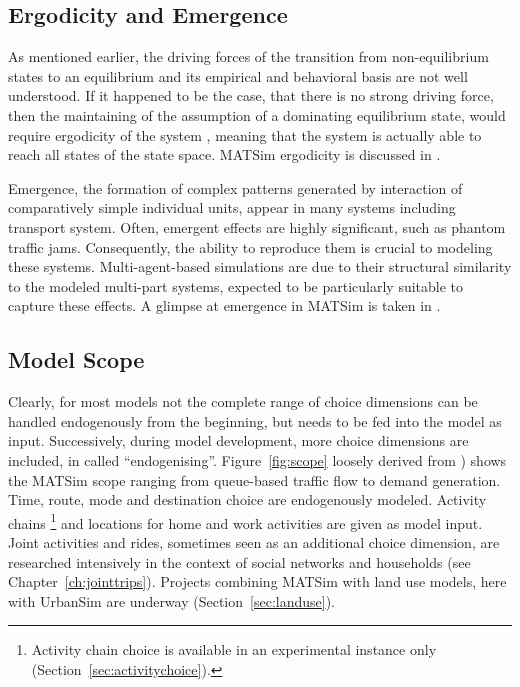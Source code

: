 
\subsection{Ergodicity and Emergence}
As mentioned earlier, the driving forces of the transition from non-equilibrium states to an equilibrium and its empirical and behavioral basis are not well understood. If it happened to be the case, that there is no strong driving force, then the maintaining of the assumption of a dominating equilibrium state, would require ergodicity of the system \citep[see also][p.252]{Holden_JTEP_1989}, meaning that the system is actually able to reach all states of the state space. MATSim ergodicity is discussed in \citet[][]{Floetteroed_unpub_MCM_2012}.    

Emergence, the formation of complex patterns generated by interaction of comparatively simple individual units, appear in many systems including transport system. Often, emergent effects are highly significant, such as phantom traffic jams. Consequently, the ability to reproduce them is crucial to modeling these systems. Multi-agent-based simulations are due to their structural similarity to the modeled multi-part systems, expected to be particularly suitable to capture these effects. A glimpse at emergence in MATSim is taken in \citet[][]{HorniMontini_STRC_2013, HorniMontini_TechRep_IVT_2013}. 

\subsection{Model Scope}
\label{sec:scope}
Clearly, for most models not the complete range of choice dimensions can be handled endogenously from the beginning, but needs to be fed into the model as input. Successively, during model development, more choice dimensions are included, in \citet[][]{NagelAxhausen_TechRep_IVT_2001} called ``endogenising''. Figure~\ref{fig:scope} loosely derived from \citet[][Figure 2]{NagelAxhausen_TechRep_IVT_2001}) shows the MATSim scope ranging from queue-based traffic flow to demand generation. Time, route, mode and destination choice are endogenously modeled. Activity chains \footnote{Activity chain choice is available in an experimental instance only (Section~\ref{sec:activitychoice}).} and locations for home and work activities are given as model input. Joint activities and rides, sometimes seen as an additional choice dimension, are researched intensively in the context of social networks and households (see Chapter~\ref{ch:jointtrips}). Projects combining MATSim with land use models, here with UrbanSim \citep[][]{NicolaiEtAl_TechRep_VSP_2011, NicolaiEtAl_ERSA_2011, SchirmerEtAl_ERSA_2011, Waddell_unpub_UrbanSimTutorial_2010} are underway (Section~\ref{sec:landuse}).

